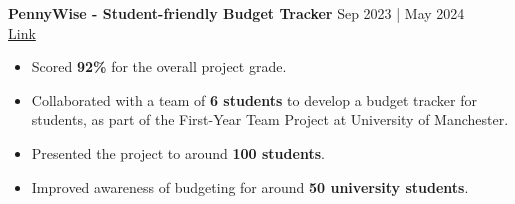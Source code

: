 \documentclass[a4paper,1.5pt]{extarticle}
\begin{document}
\noindent
\textbf{PennyWise - Student-friendly Budget Tracker} \hfill Sep 2023 | May 2024 \\ %
\href{https://github.com/manojmanikandan7/PennyWise}{Link}
\begin{itemize}
    \item Scored \textbf{92\%} for the overall project grade.
    \item Collaborated with a team of \textbf{6 students} to develop a budget tracker for students, as part of the First-Year Team Project at University of Manchester.
    \item Presented the project to around \textbf{100 students}.
    \item Improved awareness of budgeting for around \textbf{50 university students}.
\end{itemize}


\end{document}
